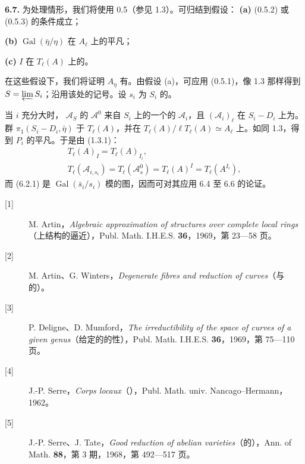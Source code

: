 \textbf{6.7.} 为处理情形，我们将使用 0.5（参见 1.3）。可归结到假设：
\textbf{(a)} (0.5.2) 或 (0.5.3) 的条件成立；

\textbf{(b)} $\operatorname{Gal}(\bar\eta/\eta)$ 在 $A_\ell$ 上的平凡；

\textbf{(c)} $I$ 在 $T_\ell(A)$ 上的。

在这些假设下，我们将证明 $A_\eta$ 有。由假设 (a)，可应用 (0.5.1)，像 1.3 那样得到 $S=\varprojlim S_i$；沿用该处的记号。设 $s_i$ 为 $S_i$ 的。

当 $i$ 充分大时， $\mathcal A_S$ 的 $\mathcal A^0$ 来自 $S_i$ 上的一个的 $\mathcal A_i$，且 $(\mathcal A_i)_\ell$ 在 $S_i-D_i$ 上为。群 $\pi_1(S_i-D_i,\bar\eta)$ 于 $T_\ell(A)$，并在 $T_\ell(A)/\ell T_\ell(A)\simeq A_\ell$ 上。如同 1.3，得到 $P_i$ 的平凡。于是由 (1.3.1)：
\[
\begin{gathered}
T_\ell(A)_I=T_\ell(A)_{I_i},\\
T_\ell(\mathcal A_{i,s_i})=T_\ell(\mathcal A_s^0)
=T_\ell(A)^I=T_\ell(A^{I_i}),
\end{gathered}
\]
而 (6.2.1) 是 $\operatorname{Gal}(\bar s_i/s_i)$ 模的图，因而可对其应用 6.4 至 6.6 的论证。

\begin{description}
\item[{[1]}] M. Artin，\emph{Algebraic approximation of structures over complete local rings}（上结构的逼近），Publ. Math. I.H.E.S. \textbf{36}，1969，第 23—58 页。
\item[{[2]}] M. Artin、G. Winters，\emph{Degenerate fibres and reduction of curves}（与的）。
\item[{[3]}] P. Deligne、D. Mumford，\emph{The irreductibility of the space of curves of a given genus}（给定的的性），Publ. Math. I.H.E.S. \textbf{36}，1969，第 75—110 页。
\item[{[4]}] J.-P. Serre，\emph{Corps locaux}（），Publ. Math. univ. Nancago–Hermann，1962。
\item[{[5]}] J.-P. Serre、J. Tate，\emph{Good reduction of abelian varieties}（的），Ann. of Math. \textbf{88}，第 3 期，1968，第 492—517 页。
\end{description}
